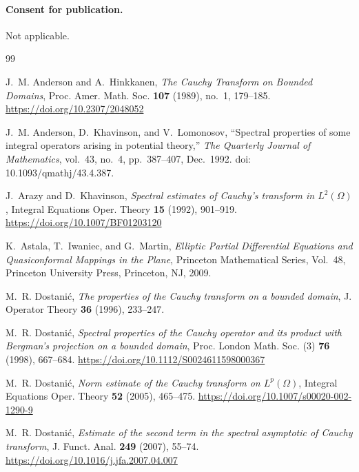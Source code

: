 \documentclass{amsart}
\theoremstyle{plain}
\theoremstyle{remark}
\begin{document}
\paragraph{\bf Consent for publication.}
Not applicable.
\begin{thebibliography}{99}

J.~M. Anderson and A.~Hinkkanen,
\emph{The Cauchy Transform on Bounded Domains},
Proc. Amer. Math. Soc. \textbf{107} (1989), no.~1, 179--185.
\url{https://doi.org/10.2307/2048052}

J.~M. Anderson, D.~Khavinson, and V.~Lomonosov,
\newblock ``Spectral properties of some integral operators arising in potential theory,''
\newblock \emph{The Quarterly Journal of Mathematics}, vol.~43, no.~4, pp.~387--407, Dec.~1992.
\newblock doi:\,10.1093/qmathj/43.4.387.

J.~Arazy and D.~Khavinson,
\emph{Spectral estimates of Cauchy's transform in $L^{2}(\Omega)$},
Integral Equations Oper. Theory \textbf{15} (1992), 901--919.
\url{https://doi.org/10.1007/BF01203120}

K.~Astala, T.~Iwaniec, and G.~Martin,
\newblock \emph{Elliptic Partial Differential Equations and Quasiconformal Mappings in the Plane},
\newblock Princeton Mathematical Series, Vol.~48,
Princeton University Press, Princeton, NJ, 2009.

M.~R. Dostani\'c,
\emph{The properties of the Cauchy transform on a bounded domain},
J. Operator Theory \textbf{36} (1996), 233--247.

M.~R. Dostani\'c,
\emph{Spectral properties of the Cauchy operator and its product with Bergman's projection on a bounded domain},
Proc. London Math. Soc. (3) \textbf{76} (1998), 667--684.
\url{https://doi.org/10.1112/S0024611598000367}

M.~R. Dostani\'c,
\emph{Norm estimate of the Cauchy transform on $L^{p}(\Omega)$},
Integral Equations Oper. Theory \textbf{52} (2005), 465--475.
\url{https://doi.org/10.1007/s00020-002-1290-9}

M.~R. Dostani\'c,
\emph{Estimate of the second term in the spectral asymptotic of Cauchy transform},
J. Funct. Anal. \textbf{249} (2007), 55--74.
\url{https://doi.org/10.1016/j.jfa.2007.04.007}


\end{thebibliography}
\end{document}
